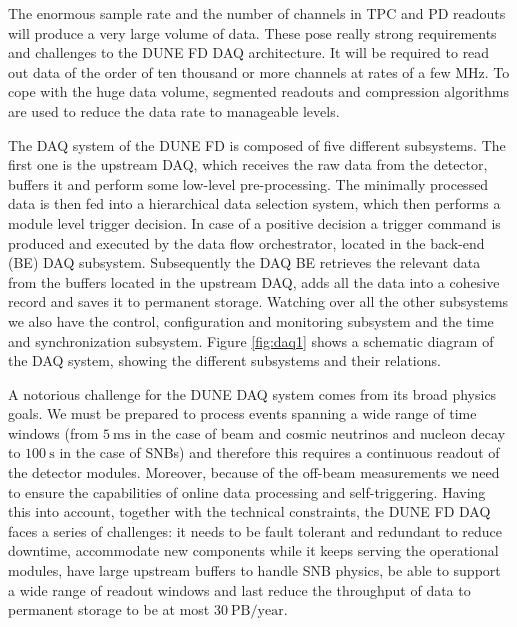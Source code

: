 The enormous sample rate and the number of channels in TPC and PD readouts will produce a very large volume of data. These pose really strong requirements and challenges to the DUNE FD DAQ architecture. It will be required to read out data of the order of ten thousand or more channels at rates of a few MHz. To cope with the huge data volume, segmented readouts and compression algorithms are used to reduce the data rate to manageable levels.

The DAQ system of the DUNE FD is composed of five different subsystems. The first one is the upstream DAQ, which receives the raw data from the detector, buffers it and perform some low-level pre-processing. The minimally processed data is then fed into a hierarchical data selection system, which then performs a module level trigger decision. In case of a positive decision a trigger command is produced and executed by the data flow orchestrator, located in the back-end (BE) DAQ subsystem. Subsequently the DAQ BE retrieves the relevant data from the buffers located in the upstream DAQ, adds all the data into a cohesive record and saves it to permanent storage. Watching over all the other subsystems we also have the control, configuration and monitoring subsystem and the time and synchronization subsystem. Figure \ref{fig:daq1} shows a schematic diagram of the DAQ system, showing the different subsystems and their relations.

A notorious challenge for the DUNE DAQ system comes from its broad physics goals. We must be prepared to process events spanning a wide range of time windows (from $5 \ \mathrm{ms}$ in the case of beam and cosmic neutrinos and nucleon decay to $100 \ \mathrm{s}$ in the case of SNBs) and therefore this requires a continuous readout of the detector modules. Moreover, because of the off-beam measurements we need to ensure the capabilities of online data processing and self-triggering. Having this into account, together with the technical constraints, the DUNE FD DAQ faces a series of challenges: it needs to be fault tolerant and redundant to reduce downtime, accommodate new components while it keeps serving the operational modules, have large upstream buffers to handle SNB physics, be able to support a wide range of readout windows and last reduce the throughput of data to permanent storage to be at most $30 \ \mathrm{PB/year}$.